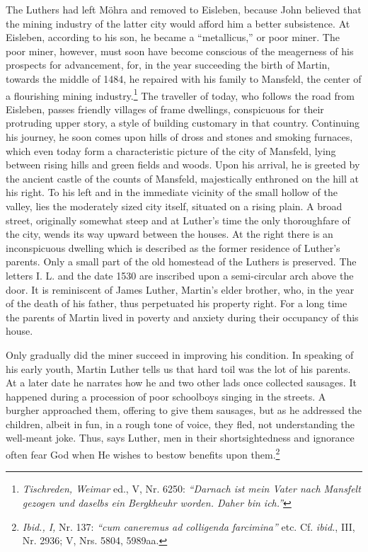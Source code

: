 The Luthers had left Möhra and removed to Eisleben, because John
believed that the mining industry of the latter city would afford
him a better subsistence. At Eisleben, according to his son, he
became a “metallicus,” or poor miner. The poor miner, however,
must soon have become conscious of the meagerness of his prospects
for advancement, for, in the year succeeding the birth of Martin,
towards the middle of 1484, he repaired with his family to Mansfeld,
the center of a flourishing mining industry.\footnote{
\textit{Tischreden, Weimar} ed., V, Nr. 6250: \textit{“Darnach ist mein Vater nach Mansfelt gezogen und daselbs ein Bergkheuhr worden. Daher bin ich.”}
}
The traveller of today,
who follows the road from Eisleben, passes friendly villages of frame
dwellings, conspicuous for their protruding upper story, a style of
building customary in that country. Continuing his journey, he soon
comes upon hills of dross and stones and smoking furnaces, which
even today form a characteristic picture of the city of Mansfeld,
lying between rising hills and green fields and woods. Upon his arrival,
he is greeted by the ancient castle of the counts of Mansfeld,
majestically enthroned on the hill at his right. To his left and in the
immediate vicinity of the small hollow of the valley, lies the moderately
sized city itself, situated on a rising plain. A broad street,
originally somewhat steep and at Luther’s time the only thoroughfare of the city,
wends its way upward between the houses. At the
right there is an inconspicuous dwelling which is described as the
former residence of Luther’s parents. Only a small part of the old
homestead of the Luthers is preserved. The letters I. L. and the date
1530 are inscribed upon a semi-circular arch above the door. It is
reminiscent of James Luther, Martin’s elder brother, who, in the
year of the death of his father, thus perpetuated his property right.
For a long time the parents of Martin lived in poverty and anxiety
during their occupancy of this house.

Only gradually did the miner succeed in improving his condition.
In speaking of his early youth, Martin Luther tells us that hard toil
was the lot of his parents. At a later date he narrates how he and two
other lads once collected sausages. It happened during a procession of
poor schoolboys singing in the streets. A burgher approached them,
offering to give them sausages, but as he addressed the children,
albeit in fun, in a rough tone of voice, they fled, not understanding
the well-meant joke. Thus, says Luther, men in their shortsightedness
and ignorance often fear God when He wishes to bestow benefits
upon them.\footnote
{\textit{Ibid., I,} Nr. 137: \textit{“cum caneremus ad colligenda farcimina”} etc. Cf. \textit{ibid.}, III, Nr. 2936;
V, Nrs. 5804, 5989aa.}

